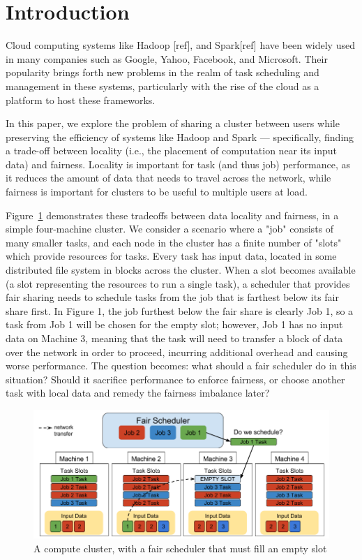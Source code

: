 \section{Introduction}\label{sec:intro}
Cloud computing systems like Hadoop [ref], and Spark[ref] have been widely 
used in many companies such as Google, Yahoo, Facebook, and Microsoft. Their popularity 
brings forth new problems in the realm of task scheduling and management in these systems,
particularly with the rise of the cloud as a platform to host these frameworks.

In this paper, we explore the problem of sharing a cluster between users while preserving 
the efficiency of systems like Hadoop and Spark --- specifically, finding a trade-off 
between locality (i.e., the placement of computation near its input data) and fairness. 
Locality is important for task (and thus job) performance, as it reduces the amount of data 
that needs to travel across the network, while fairness is important for clusters to be 
useful to multiple users at load. 

Figure~\ref{fig:cluster}  demonstrates these tradeoffs between data locality and fairness,
in a simple four-machine cluster. We consider a
scenario where a "job" consists of many smaller tasks, and each node in the cluster 
has a finite number of "slots" which provide resources for tasks. Every task has input data,
located in some distributed file system in blocks across the cluster. When a slot
becomes available (a slot representing the resources to run a single task),
a scheduler that provides fair sharing needs to schedule tasks from the job 
that is farthest below its fair share first. In Figure 1, the job furthest below
the fair share is clearly Job 1, so a task from Job 1 will be chosen for the empty slot; however,
Job 1 has no input data on Machine 3, meaning that the task will need to transfer a block
of data over the network in order to proceed, incurring additional overhead and causing
worse performance. The question becomes: what should a fair scheduler do
in this situation? Should it sacrifice performance to enforce fairness, or choose another task
with local data and remedy the fairness imbalance later? 

\begin{figure}[t]
        \includegraphics[width=\linewidth]{./fig1.png}
        \caption{A compute cluster, with a fair scheduler that must fill an empty slot}
        \label{fig:cluster}
    \endminipage
\end{figure}

